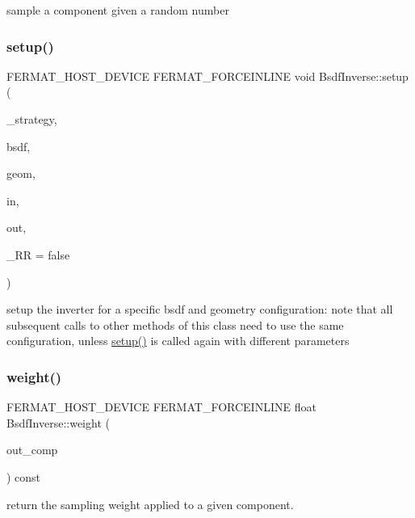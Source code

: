 sample a component given a random number \mbox{\label{group___path_module_gaecfd88fd5ceeaef4df9d86387855e78c}} 
\subsubsection{\texorpdfstring{setup()}{setup()}}
{\footnotesize\ttfamily F\+E\+R\+M\+A\+T\+\_\+\+H\+O\+S\+T\+\_\+\+D\+E\+V\+I\+CE F\+E\+R\+M\+A\+T\+\_\+\+F\+O\+R\+C\+E\+I\+N\+L\+I\+NE void Bsdf\+Inverse\+::setup (\begin{DoxyParamCaption}\item[{Component\+Selection\+Strategy}]{\+\_\+strategy,  }\item[{const \hyperlink{struct_bsdf}{Bsdf} \&}]{bsdf,  }\item[{const \hyperlink{struct_vertex_geometry}{Vertex\+Geometry} \&}]{geom,  }\item[{const \hyperlink{structcugar_1_1_vector}{cugar\+::\+Vector3f} \&}]{in,  }\item[{const \hyperlink{structcugar_1_1_vector}{cugar\+::\+Vector3f} \&}]{out,  }\item[{const bool}]{\+\_\+\+RR = {\ttfamily false} }\end{DoxyParamCaption})}

setup the inverter for a specific bsdf and geometry configuration\+: note that all subsequent calls to other methods of this class need to use the same configuration, unless \hyperlink{group___path_module_gaecfd88fd5ceeaef4df9d86387855e78c}{setup()} is called again with different parameters \mbox{\label{group___path_module_ga26ab6168a450774594081beba929f9fa}} 
\subsubsection{\texorpdfstring{weight()}{weight()}}
{\footnotesize\ttfamily F\+E\+R\+M\+A\+T\+\_\+\+H\+O\+S\+T\+\_\+\+D\+E\+V\+I\+CE F\+E\+R\+M\+A\+T\+\_\+\+F\+O\+R\+C\+E\+I\+N\+L\+I\+NE float Bsdf\+Inverse\+::weight (\begin{DoxyParamCaption}\item[{const \hyperlink{struct_bsdf_a5f7db6f81220ed9ee6da109d6eb5b585}{Bsdf\+::\+Component\+Type}}]{out\+\_\+comp }\end{DoxyParamCaption}) const}

return the sampling weight applied to a given component. 